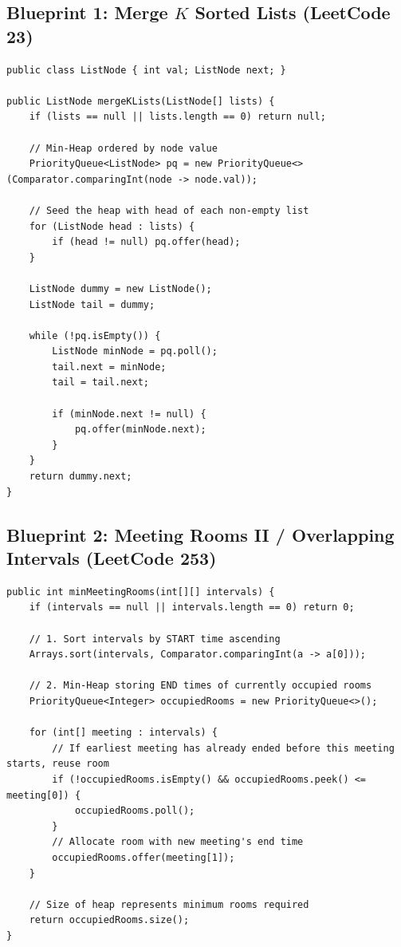 \documentclass[10pt,journal,compsoc,onecolumn]{IEEEtran}
\begin{document}
\subsection{Blueprint 1: Merge $K$ Sorted Lists (LeetCode 23)}
\begin{verbatim}
public class ListNode { int val; ListNode next; }

public ListNode mergeKLists(ListNode[] lists) {
    if (lists == null || lists.length == 0) return null;

    // Min-Heap ordered by node value
    PriorityQueue<ListNode> pq = new PriorityQueue<>(Comparator.comparingInt(node -> node.val));

    // Seed the heap with head of each non-empty list
    for (ListNode head : lists) {
        if (head != null) pq.offer(head);
    }

    ListNode dummy = new ListNode();
    ListNode tail = dummy;

    while (!pq.isEmpty()) {
        ListNode minNode = pq.poll();
        tail.next = minNode;
        tail = tail.next;

        if (minNode.next != null) {
            pq.offer(minNode.next);
        }
    }
    return dummy.next;
}
\end{verbatim}

\subsection{Blueprint 2: Meeting Rooms II / Overlapping Intervals (LeetCode 253)}
\begin{verbatim}
public int minMeetingRooms(int[][] intervals) {
    if (intervals == null || intervals.length == 0) return 0;

    // 1. Sort intervals by START time ascending
    Arrays.sort(intervals, Comparator.comparingInt(a -> a[0]));

    // 2. Min-Heap storing END times of currently occupied rooms
    PriorityQueue<Integer> occupiedRooms = new PriorityQueue<>();

    for (int[] meeting : intervals) {
        // If earliest meeting has already ended before this meeting starts, reuse room
        if (!occupiedRooms.isEmpty() && occupiedRooms.peek() <= meeting[0]) {
            occupiedRooms.poll();
        }
        // Allocate room with new meeting's end time
        occupiedRooms.offer(meeting[1]);
    }

    // Size of heap represents minimum rooms required
    return occupiedRooms.size();
}
\end{verbatim}
\end{document}
